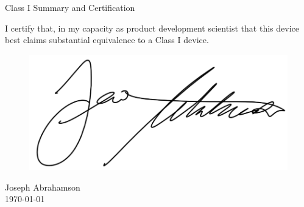 \newpage
{}
\singlespacing
\begin{center}
  \large{Class I Summary and Certification}
\end{center}

\onehalfspacing

I certify that, in my capacity as product development scientist that
this device best claims substantial equivalence to a Class I device.

\begin{figure}[H]
  \includegraphics[width=0.35\linewidth]{imgs/ja-sig}
\end{figure}

\noindent Joseph Abrahamson \\
\today

